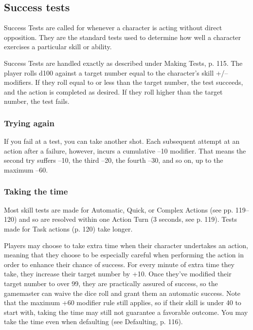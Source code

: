 \subsection{Success tests}
\label{sec:success-tests}

Success Tests are called for whenever a character is acting without direct opposition. They are the standard tests used to determine how well a character exercises a particular skill or ability.

Success Tests are handled exactly as described under Making Tests, p. 115. The player rolls d100 against a target number equal to the character's skill +/– modifiers. If they roll equal to or less than the target number, the test succeeds, and the action is completed as desired. If they roll higher than the target number, the test fails.

\subsubsection{Trying again}
\label{sec:trying-again}

If you fail at a test, you can take another shot. Each subsequent attempt at an action after a failure, however, incurs a cumulative –10 modifier. That means the second try suffers –10, the third –20, the fourth –30, and so on, up to the maximum –60.

\subsubsection{Taking the time}
\label{sec:taking-time}

Most skill tests are made for Automatic, Quick, or Complex Actions (see pp. 119–120) and so are resolved within one Action Turn (3 seconds, see p. 119). Tests made for Task actions (p. 120) take longer.

Players may choose to take extra time when their character undertakes an action, meaning that they choose to be especially careful when performing the action in order to enhance their chance of success. For every minute of extra time they take, they increase their target number by +10. Once they've modified their target number to over 99, they are practically assured of success, so the gamemaster can waive the dice roll and grant them an automatic success. Note that the maximum +60 modifier rule still applies, so if their skill is under 40 to start with, taking the time may still not guarantee a favorable outcome. You may take the time even when defaulting (see Defaulting, p. 116).

